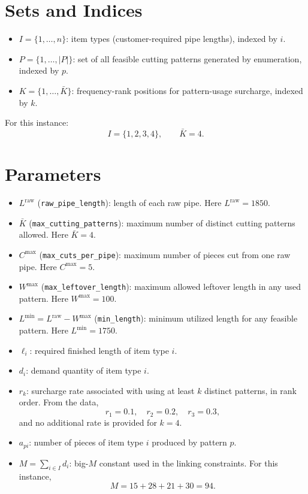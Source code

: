\section*{Sets and Indices}

\begin{itemize}
    \item $I = \{1,\dots,n\}$: item types (customer-required pipe lengths), indexed by $i$.
    \item $P = \{1,\dots,|P|\}$: set of all feasible cutting patterns generated by enumeration, indexed by $p$.
    \item $K = \{1,\dots,\bar K\}$: frequency-rank positions for pattern-usage surcharge, indexed by $k$.
\end{itemize}

For this instance:
\[
I=\{1,2,3,4\},\qquad \bar K = 4.
\]

\section*{Parameters}

\begin{itemize}
    \item $L^{\text{raw}}$ (\texttt{raw\_pipe\_length}): length of each raw pipe. Here $L^{\text{raw}}=1850$.
    \item $\bar K$ (\texttt{max\_cutting\_patterns}): maximum number of distinct cutting patterns allowed. Here $\bar K=4$.
    \item $C^{\max}$ (\texttt{max\_cuts\_per\_pipe}): maximum number of pieces cut from one raw pipe. Here $C^{\max}=5$.
    \item $W^{\max}$ (\texttt{max\_leftover\_length}): maximum allowed leftover length in any used pattern. Here $W^{\max}=100$.
    \item $L^{\min}=L^{\text{raw}}-W^{\max}$ (\texttt{min\_length}): minimum utilized length for any feasible pattern. Here $L^{\min}=1750$.
    \item $\ell_i$: required finished length of item type $i$.
    \item $d_i$: demand quantity of item type $i$.
    \item $r_k$: surcharge rate associated with using at least $k$ distinct patterns, in rank order. From the data,
    \[
    r_1=0.1,\quad r_2=0.2,\quad r_3=0.3,
    \]
    and no additional rate is provided for $k=4$.
    \item $a_{pi}$: number of pieces of item type $i$ produced by pattern $p$.
    \item $M=\sum_{i\in I} d_i$: big-$M$ constant used in the linking constraints. For this instance,
    \[
    M=15+28+21+30=94.
    \]
\end{itemize}

